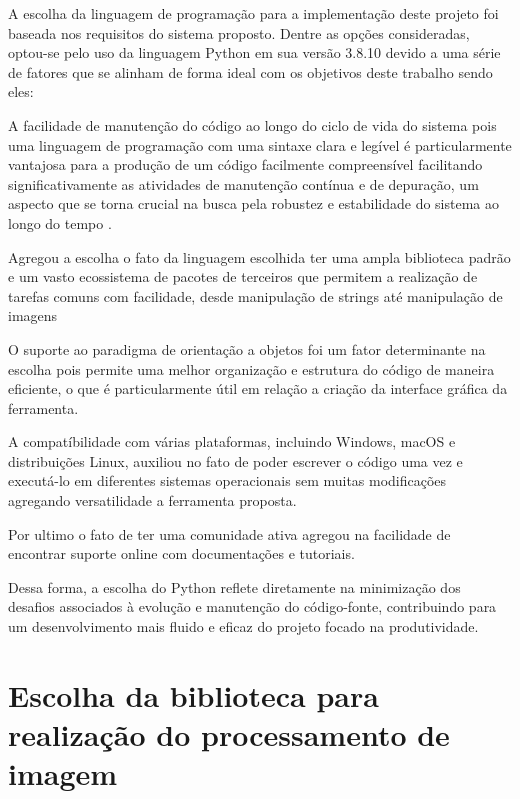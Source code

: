 A escolha da linguagem de programação para a implementação deste projeto foi baseada nos requisitos do sistema proposto. Dentre as opções consideradas, optou-se pelo uso da linguagem Python em sua versão 3.8.10 devido a uma série de fatores que se alinham de forma ideal com os objetivos deste trabalho sendo eles:

A facilidade de manutenção do código ao longo do ciclo de vida do sistema pois uma linguagem de programação com uma sintaxe clara e legível é particularmente vantajosa para a produção de um código facilmente compreensível facilitando significativamente as atividades de manutenção contínua e de depuração, um aspecto que se torna crucial na busca pela robustez e estabilidade do sistema ao longo do tempo \cite{clean_code}.

Agregou a escolha o fato da linguagem escolhida ter uma ampla biblioteca padrão e um vasto ecossistema de pacotes de terceiros que permitem a realização de tarefas comuns com facilidade, desde manipulação de strings até manipulação de imagens

O suporte ao paradigma de orientação a objetos foi um fator determinante na escolha pois permite uma melhor organização e estrutura do código de maneira  eficiente, o que é particularmente útil em relação a criação da interface gráfica da ferramenta.

A compatíbilidade com várias plataformas, incluindo Windows, macOS e  distribuições Linux, auxiliou no fato de poder escrever o código uma vez e executá-lo em diferentes sistemas operacionais sem muitas modificações agregando 
 versatilidade a ferramenta proposta.

Por ultimo o fato de ter uma comunidade ativa agregou na facilidade de encontrar suporte online com documentações e tutoriais.

Dessa forma, a escolha do Python reflete diretamente na minimização dos desafios associados à evolução e manutenção do código-fonte, contribuindo para um desenvolvimento mais fluido e eficaz do projeto focado na produtividade.




\section[Escolha da biblioteca para realização do processamento de imagem]{Escolha da biblioteca para realização do processamento de imagem}\label{sec:Escolha da biblioteca para realizacao do processamento de imagem}

